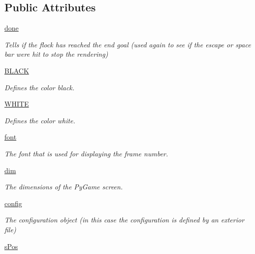 \subsection*{Public Attributes}
\begin{DoxyCompactItemize}
\item 
\hyperlink{classboidsimulation_1_1FlockSim_a970e9fcbc5d69b3987f226af5249038a}{done}
\begin{DoxyCompactList}\small\item\em Tells if the flock has reached the end goal (used again to see if the escape or space bar were hit to stop the rendering) \end{DoxyCompactList}\item 
\hyperlink{classboidsimulation_1_1FlockSim_ac9c61aa93f3db94b9a340b8555d90adf}{B\-L\-A\-C\-K}
\begin{DoxyCompactList}\small\item\em Defines the color black. \end{DoxyCompactList}\item 
\hyperlink{classboidsimulation_1_1FlockSim_afe8d83a914aeae9d188cdf61053de56c}{W\-H\-I\-T\-E}
\begin{DoxyCompactList}\small\item\em Defines the color white. \end{DoxyCompactList}\item 
\hyperlink{classboidsimulation_1_1FlockSim_aa5993f8033dcbbb0383c204877d1dd20}{font}
\begin{DoxyCompactList}\small\item\em The font that is used for displaying the frame number. \end{DoxyCompactList}\item 
\hyperlink{classboidsimulation_1_1FlockSim_a2ba5ffd4d4ef009af8735d838eaf59d3}{dim}
\begin{DoxyCompactList}\small\item\em The dimensions of the Py\-Game screen. \end{DoxyCompactList}\item 
\hyperlink{classboidsimulation_1_1FlockSim_abf487d6e84851334a79656b5df3c8492}{config}
\begin{DoxyCompactList}\small\item\em The configuration object (in this case the configuration is defined by an exterior file) \end{DoxyCompactList}\item 
\hyperlink{classboidsimulation_1_1FlockSim_a1658c675990b8bdb3955cae1b7292b38}{s\-Pos}

\end{DoxyCompactItemize}
